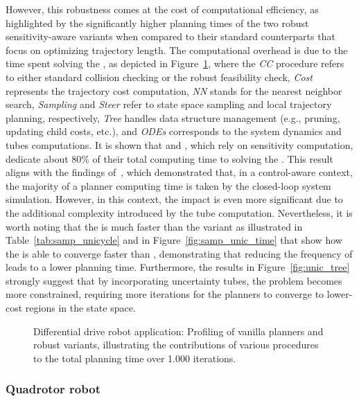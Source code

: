 However, this robustness comes at the cost of computational efficiency, as highlighted by the significantly higher planning times of the two robust sensitivity-aware variants when compared to their standard counterparts that focus on optimizing trajectory length.
The computational overhead is due to the time spent solving the , as depicted in Figure~\ref{fig:profiling_unic}, where the \emph{CC} procedure refers to either standard collision checking or the robust feasibility check, \emph{Cost} represents the trajectory cost computation, \emph{NN} stands for the nearest neighbor search, \emph{Sampling} and \emph{Steer} refer to state space sampling and local trajectory planning, respectively, \emph{Tree} handles data structure management (e.g., pruning, updating child costs, etc.), and \emph{ODEs} corresponds to the system dynamics and tubes computations.
It is shown that  and , which rely on sensitivity computation, dedicate about 80\% of their total computing time to solving the .
This result aligns with the findings of~\cite{cTognon}, which demonstrated that, in a control-aware context, the majority of a planner computing time is taken by the closed-loop system simulation.
However, in this context, the impact is even more significant due to the additional complexity introduced by the tube computation.
Nevertheless, it is worth noting that the  is much faster than the  variant as illustrated in Table~\ref{tab:samp_unicycle} and in Figure~\ref{fig:samp_unic_time} that show how the  is able to converge faster than , demonstrating that reducing the frequency of  leads to a lower planning time.
Furthermore, the results in Figure~\ref{fig:unic_tree} strongly suggest that by incorporating uncertainty tubes, the problem becomes more constrained, requiring more iterations for the planners to converge to lower-cost regions in the state space.

\begin{figure} [t!]
    \centering
     
    \caption{Differential drive robot application: Profiling of vanilla planners and robust  variants, illustrating the contributions of various procedures to the total planning time over 1.000 iterations.}%
    \label{fig:profiling_unic}%
\end{figure}

\subsubsection{Quadrotor robot}\label{sec:quad_setup_samp}

